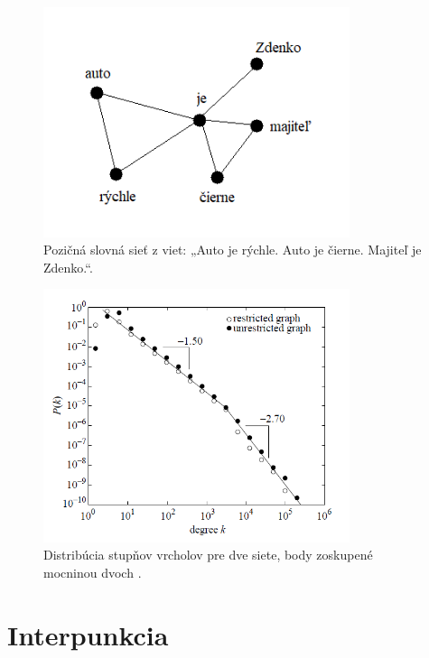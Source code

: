 \begin{figure}
    \centerline{\includegraphics[width=0.8\textwidth]{images/wan.png}}
    \caption[Pozičná slovná sieť.]{Pozičná slovná sieť z viet: „Auto je rýchle. Auto je čierne. Majiteľ je Zdenko.“.}
    \label{obr:wan}
\end{figure}

\begin{figure}
    \centerline{\includegraphics[width=0.8\textwidth]{images/degdist.png}}
    \caption[Distribúcia stupňov vrcholov.]{Distribúcia stupňov vrcholov pre dve siete, body zoskupené mocninou dvoch \cite{cancho2001small} .}
    \label{obr:degdist}
\end{figure}


\section{Interpunkcia}\label{sec:punctuation}